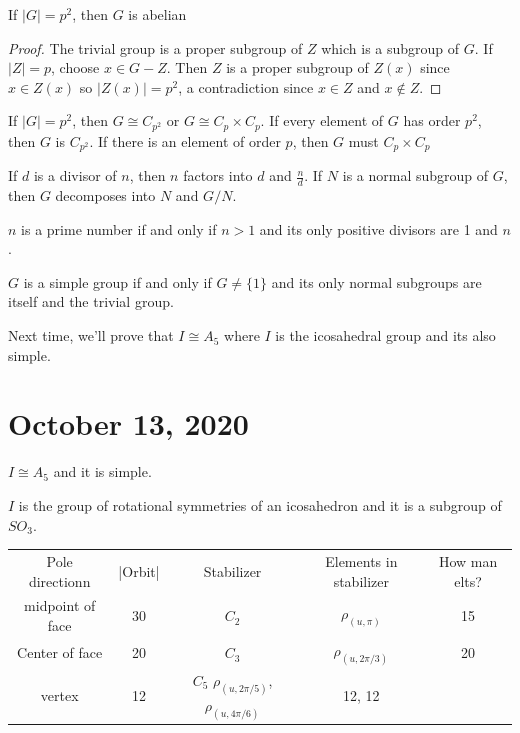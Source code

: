 \documentclass{article}
\begin{document}
\begin{proposition}
If $|G|=p^2$, then $G$ is abelian
\end{proposition}
\begin{proof}
The trivial group is a proper subgroup of $Z$ which is a subgroup of $G$. If $|Z|=p$, choose $x\in G-Z$. Then $Z$ is a proper subgroup of $Z(x)$ since $x\in Z(x)$ so $|Z(x)|=p^2$, a contradiction since $x\in Z$ and $x\notin Z$. 
\end{proof}
\begin{proposition}
If $|G|=p^2$, then $G\cong C_{p^2}$ or $G\cong C_p\times C_p$.
If every element of $G$ has order $p^2$, then $G$ is $C_{p^2}$. If there is an element of order $p$, then $G$ must $C_p\times C_p$
\end{proposition}
If $d$ is a divisor of $n$, then $n$ factors into $d$ and $\frac{n}{d}$. If $N$ is a normal subgroup of $G$, then $G$ decomposes into $N$ and $G/N$. 
\begin{definition}
$n$ is a prime number if and only if $n>1$ and its only positive divisors are 1 and $n$.
\end{definition}
\begin{definition}
$G$ is a simple group if and only if $G\neq\{1\}$ and its only normal subgroups are itself and the trivial group. 
\end{definition}
Next time, we'll prove that $I\cong A_5$ where $I$ is the icosahedral group and its also simple. 
\section{October 13, 2020}
\begin{theorem}
$I\cong A_5$ and it is simple. 
\end{theorem}
$I$ is the group of rotational symmetries of an icosahedron and it is a subgroup of $SO_3$. 

\begin{tabular}{c|c|c|c|c}
    Pole directionn &  |Orbit| & Stabilizer & Elements in stabilizer & How man elts?\\
    midpoint of face & 30 & $C_2$ &$\rho_{(u,\pi)}$ & 15\\
    Center of face & 20 & $C_3$ & $\rho_{(u,2\pi/3)}$ & 20\\
    vertex & 12 & $C_5$ $\rho_{(u,2\pi/5)}$, $\rho_{(u,4\pi/6)}$ & 12, 12
\end{tabular}
\end{document}
